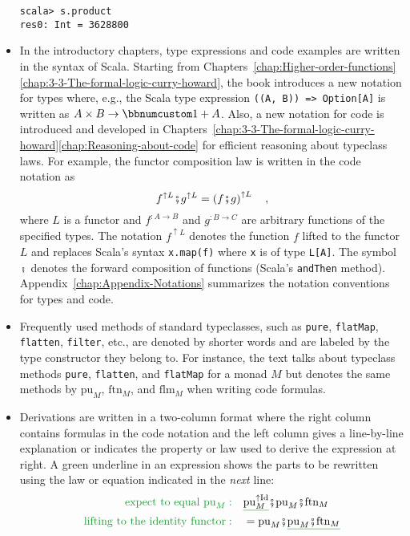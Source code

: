 \begin{itemize}
\begin{lstlisting}[mathescape=true]
scala> s.product
res0: Int = 3628800 
\end{lstlisting}
\item In the introductory chapters, type expressions and code examples are
written in the syntax of Scala. Starting from Chapters~\ref{chap:Higher-order-functions}\textendash \ref{chap:3-3-The-formal-logic-curry-howard},
the book introduces a new notation for types where, e.g., the Scala
type expression \lstinline!((A, B)) => Option[A]! is written as $A\times B\rightarrow\bbnum 1+A$.
Also, a new notation for code is introduced and developed in Chapters~\ref{chap:3-3-The-formal-logic-curry-howard}\textendash \ref{chap:Reasoning-about-code}
for efficient reasoning about typeclass laws. For example, the functor
composition law is written in the code notation as
\[
f^{\uparrow L}\bef g^{\uparrow L}=\left(f\bef g\right)^{\uparrow L}\quad,
\]
where $L$ is a functor and $f^{:A\rightarrow B}$ and $g^{:B\rightarrow C}$
are arbitrary functions of the specified types. The notation $f^{\uparrow L}$
denotes the function $f$ lifted to the functor $L$ and replaces
Scala\textsf{'}s syntax \lstinline!x.map(f)! where \lstinline!x! is of type
\lstinline!L[A]!. The symbol $\bef$ denotes the forward composition
of functions (Scala\textsf{'}s \lstinline!andThen! method). Appendix~\ref{chap:Appendix-Notations}
summarizes the notation conventions for types and code.
\item Frequently used methods of standard typeclasses, such as \lstinline!pure!,
\lstinline!flatMap!, \lstinline!flatten!, \lstinline!filter!, etc.,
are denoted by shorter words and are labeled by the type constructor
they belong to. For instance, the text talks about typeclass methods
\lstinline!pure!, \lstinline!flatten!, and \lstinline!flatMap!
for a monad $M$ but denotes the same methods by $\text{pu}_{M}$,
$\text{ftn}_{M}$, and $\text{flm}_{M}$ when writing code formulas.
\item Derivations are written in a two-column format where the right column
contains formulas in the code notation and the left column gives a
line-by-line explanation or indicates the property or law used to
derive the expression at right. A green underline in an expression
shows the parts to be rewritten using the law or equation indicated
in the \emph{next} line:
\begin{align*}
{\color{greenunder}\text{expect to equal }\text{pu}_{M}:}\quad & \gunderline{\text{pu}_{M}^{\uparrow\text{Id}}}\bef\text{pu}_{M}\bef\text{ftn}_{M}\\
{\color{greenunder}\text{lifting to the identity functor}:}\quad & =\text{pu}_{M}\bef\gunderline{\text{pu}_{M}\bef\text{ftn}_{M}}\\

\end{align*}
\end{itemize}
